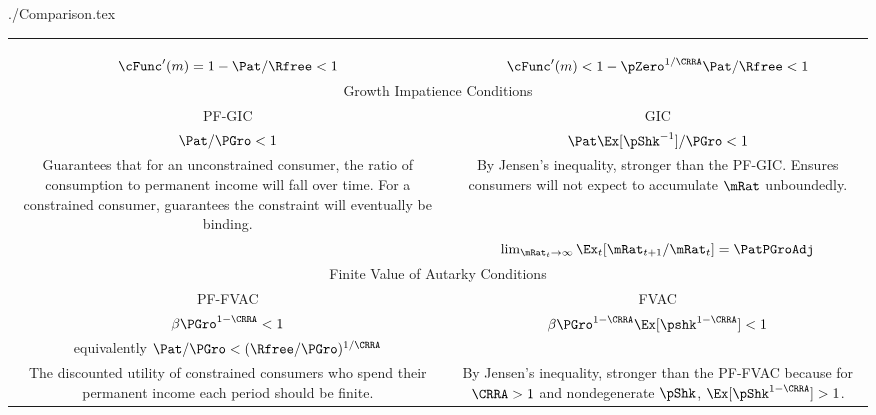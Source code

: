 \documentclass[titlepage,abstract]{bejournal}
\begin{document}
\begin{verbatimwrite}{./Comparison.tex}
\begin{table}[!th]
\begin{center}
\begin{tabular}{|c|c|}
& \\
& \\
& \\
$\cFunc^{\prime}(m) = 1-\Pat/\Rfree < 1$              & $\cFunc^{\prime}(m) < 1-\pZero^{1/\CRRA}\Pat/\Rfree < 1$ 
\\ \hline
\multicolumn{2}{|c|}{Growth Impatience Conditions} \\ \hline
\multicolumn{1}{|c|}{PF-GIC} & \multicolumn{1}{c|}{GIC} \\ \hline
$\Pat/\PGro < 1$                                         & $\Pat\Ex[\pShk^{-1}]/\PGro < 1 $ \\
\multirow{4}{75mm}{Guarantees that for an unconstrained consumer, the ratio of consumption to permanent income will fall over time.  For a constrained consumer, guarantees the constraint will eventually be binding.} &
\multirow{4}{75mm}{By Jensen's inequality, stronger than the PF-GIC.  Ensures consumers will not expect to accumulate $\mRat$ unboundedly.} \\
& \\
& \\
& \\
& $\lim_{\mRat_{t} \rightarrow \infty} \Ex_{t}[\mRat_{t+1}/\mRat_{t}] = \PatPGroAdj $
 \\ \hline
\multicolumn{2}{|c|}{Finite Value of Autarky Conditions} \\ \hline
\multicolumn{1}{|c|}{PF-FVAC} & \multicolumn{1}{c|}{FVAC} \\ \hline
$\beta \PGro^{1-\CRRA} < 1$                                                 & $\beta \PGro^{1-\CRRA}\Ex[\pshk^{1-\CRRA}] < 1$  \\
equivalently $\Pat/\PGro  < (\Rfree/\PGro)^{1/\CRRA}$ & \\
\multirow{3}{75mm}{The discounted utility of constrained consumers who spend their permanent income each period should be finite.} &
\multirow{3}{75mm}{By Jensen's inequality, stronger than the PF-FVAC because for $\CRRA>1$ and nondegenerate $\pShk$, $\Ex[\pShk^{1-\CRRA}] > 1$.}  \\
& \\
& \\ \hline
\end{tabular}
\end{center}
\end{table}
\clearpage 
\end{verbatimwrite}


\end{document}
